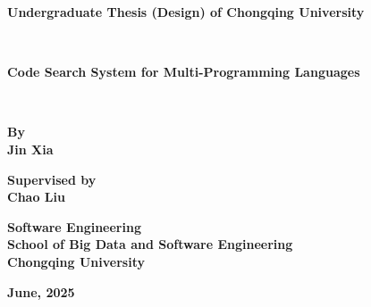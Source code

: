\documentclass[UTF8,a4paper,12pt]{ctexart}
\numberwithin{equation}{section}
\begin{document}
\newpage
\thispagestyle{empty}
\setmainfont{Times New Roman}
\begin{center}
\textbf{
Undergraduate Thesis (Design) of Chongqing University}
\end{center}
~\\
\begin{center}
\textbf{Code Search System for Multi-Programming Languages}
\end{center}

~\\
\renewcommand{\headrulewidth}{1pt}
\begin{figure}[htb] 
  \centering
     \end{figure}
     

\setmainfont{Times New Roman}
\begin{center}
\textbf{By}  \\
\textbf{Jin Xia}
\end{center}

\begin{center}
\textbf{Supervised by}\\
\textbf{Chao Liu}\\
\end{center}

\begin{center}
\textbf{Software Engineering}\\ %
\textbf{	School of Big Data and Software Engineering}\\ %
\textbf{Chongqing University}
\end{center}

\begin{center}
\textbf{June, 2025}
\end{center}


\newpage
\pagestyle{fancy}




\end{document}

